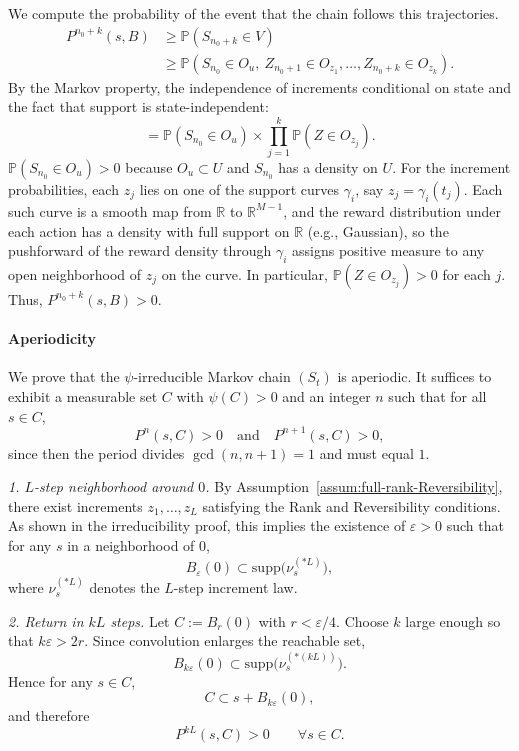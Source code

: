 \documentclass[12pt]{article}
\begin{document}
We compute the probability of the event that the chain follows this trajectories.
\begin{align*}
    P^{n_0+k}(s, B) &\ge \mathbb{P}\left( S_{n_0+k} \in V \right) \\
    &\ge \mathbb{P}\left( S_{n_0} \in O_u, \ Z_{n_0+1} \in O_{z_1}, \dots, Z_{n_0+k} \in O_{z_k} \right).
\end{align*}
By the Markov property, the independence of increments conditional on state and the fact that support is state-independent:
\[
    = \mathbb{P}(S_{n_0} \in O_u) \times \prod_{j=1}^k \mathbb{P}(Z \in O_{z_j}).
\]
$\mathbb{P}(S_{n_0} \in O_u) > 0$ because $O_u \subset U$ and $S_{n_0}$ has a density on $U$. For the increment probabilities, each $z_j$ lies on one of the support curves $\gamma_i$, say $z_j = \gamma_i(t_j)$. Each such curve is a smooth map from $\mathbb{R}$ to $\mathbb{R}^{M-1}$, and the reward distribution under each action has a density with full support on $\mathbb{R}$ (e.g., Gaussian), so the pushforward of the reward density through $\gamma_i$ assigns positive measure to any open neighborhood of $z_j$ on the curve. In particular, $\mathbb{P}(Z \in O_{z_j}) > 0$ for each $j$. Thus, $P^{n_0+k}(s, B) > 0$.

\paragraph{Aperiodicity} We prove that the $\psi$-irreducible Markov chain $(S_t)$ is aperiodic. It suffices to exhibit a measurable set $C$ with $\psi(C)>0$ and an integer $n$
such that for all $s\in C$,
\[
P^{n}(s,C)>0
\quad\text{and}\quad
P^{n+1}(s,C)>0,
\]
since then the period divides $\gcd(n,n+1)=1$ and must equal $1$.

\textit{1. $L$-step neighborhood around $0$.} By Assumption~\ref{assum:full-rank-Reversibility}, there exist increments
$z_1,\dots,z_L$ satisfying the Rank and Reversibility conditions.
As shown in the irreducibility proof, this implies the existence of $\varepsilon>0$
such that for any $s$ in a neighborhood of $0$,
\[
B_\varepsilon(0)
\subset
\mathrm{supp}\big(\nu_s^{(*L)}\big),
\]
where $\nu_s^{(*L)}$ denotes the $L$-step increment law.

\textit{2. Return in $kL$ steps.} Let $C := B_r(0)$ with $r<\varepsilon/4$.
Choose $k$ large enough so that $k\varepsilon > 2r$.
Since convolution enlarges the reachable set,
\[
B_{k\varepsilon}(0)
\subset
\mathrm{supp}\big(\nu_s^{(*(kL))}\big).
\]
Hence for any $s\in C$,
\[
C \subset s + B_{k\varepsilon}(0),
\]
and therefore
\[
P^{kL}(s,C) > 0
\qquad\forall s\in C.
\]
\end{document}
